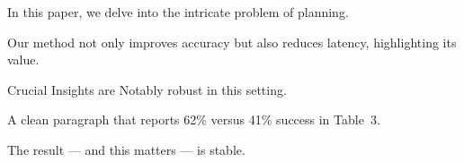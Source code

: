 In this paper, we delve into the intricate problem of planning.

Our method not only improves accuracy but also reduces latency, highlighting its value.

Crucial Insights are Notably robust in this setting.

\begin{landscape}
A clean paragraph that reports 62\% versus 41\% success in Table~3.
\end{landscape}

The result --- and this matters --- is stable.
